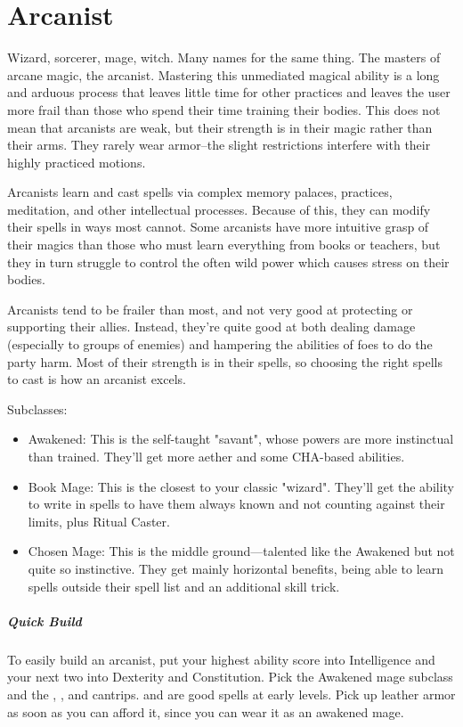 \section{Arcanist\label{class:arcanist}}

Wizard, sorcerer, mage, witch. Many names for the same thing. The masters of arcane magic, the arcanist. Mastering this unmediated magical ability is a long and arduous process that leaves little time for other practices and leaves the user more frail than those who spend their time training their bodies. This does not mean that arcanists are weak, but their strength is in their magic rather than their arms. They rarely wear armor--the slight restrictions interfere with their highly practiced motions.

Arcanists learn and cast spells via complex memory palaces, practices, meditation, and other intellectual processes. Because of this, they can modify their spells in ways most cannot. Some arcanists have more intuitive grasp of their magics than those who must learn everything from books or teachers, but they in turn struggle to control the often wild power which causes stress on their bodies.

Arcanists tend to be frailer than most, and not very good at protecting or supporting their allies. Instead, they're quite good at both dealing damage (especially to groups of enemies) and hampering the abilities of foes to do the party harm. Most of their strength is in their spells, so choosing the right spells to cast is how an arcanist excels.

Subclasses:
\begin{itemize}
	\item Awakened: This is the self-taught "savant", whose powers are more instinctual than trained. They'll get more aether and some CHA-based abilities.
	\item Book Mage: This is the closest to your classic "wizard". They'll get the ability to write in spells to have them always known and not counting against their limits, plus Ritual Caster.
  \item Chosen Mage: This is the middle ground---talented like the Awakened but not quite so instinctive. They get mainly horizontal benefits, being able to learn spells outside their spell list and an additional skill trick.
\end{itemize}

\subparagraph*{Quick Build}
To easily build an arcanist, put your highest ability score into Intelligence and your next two into Dexterity and Constitution. Pick the Awakened mage subclass and the , ,  and  cantrips.  and  are good spells at early levels. Pick up leather armor as soon as you can afford it, since you can wear it as an awakened mage.

